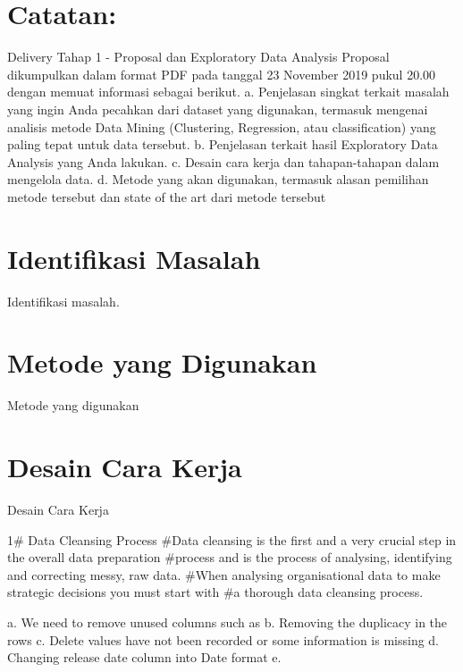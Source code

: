 \documentclass{article}
\begin{document}
    \begin{normalsize}
    
        \section{Catatan:}
        
        Delivery Tahap 1 - Proposal dan Exploratory Data Analysis
        Proposal dikumpulkan dalam format PDF pada tanggal 23 November 2019 pukul 20.00
        dengan memuat informasi sebagai berikut.
        a. Penjelasan singkat terkait masalah yang ingin Anda pecahkan dari dataset yang
        digunakan, termasuk mengenai analisis metode Data Mining (Clustering,
        Regression, atau classification) yang paling tepat untuk data tersebut.
        b. Penjelasan terkait hasil Exploratory Data Analysis yang Anda lakukan.
        c. Desain cara kerja dan tahapan-tahapan dalam mengelola data.
        d. Metode yang akan digunakan, termasuk alasan pemilihan metode tersebut dan
        state of the art dari metode tersebut
        
        \section{Identifikasi Masalah}
        
        Identifikasi masalah.
        
        \section{Metode yang Digunakan}

        Metode yang digunakan

        \section{Desain Cara Kerja}

        Desain Cara Kerja

        1# Data Cleansing Process
        #Data cleansing is the first and a very crucial step in the overall data preparation
        #process and is the process of analysing, identifying and correcting messy, raw data.
        #When analysing organisational data to make strategic decisions you must start with
        #a thorough data cleansing process.

        a. We need to remove unused columns such as
        b. Removing the duplicacy in the rows
        c. Delete values have not been recorded or some information is missing
        d. Changing release date column into Date format
        e. 


\end{normalsize}
\end{document}
